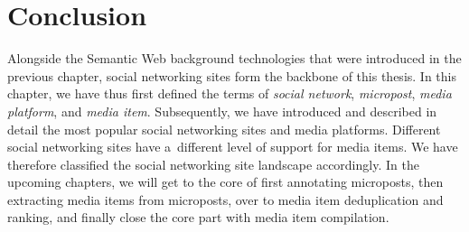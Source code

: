 \section{Conclusion}
Alongside the Semantic Web background technologies
that were introduced in the previous chapter,
social networking sites form the backbone of this thesis.
In this chapter, we have thus first defined the terms of \emph{social network},
\emph{micropost}, \emph{media platform}, and \emph{media item}.
Subsequently, we have introduced and described in detail
the most popular social networking sites and media platforms.
Different social networking sites have a~different level of support for media items.
We have therefore classified the social networking site landscape accordingly.
In the upcoming chapters, we will get to the core of
first annotating microposts,
then extracting media items from microposts,
over to media item deduplication and ranking,
and finally close the core part with media item compilation.
 